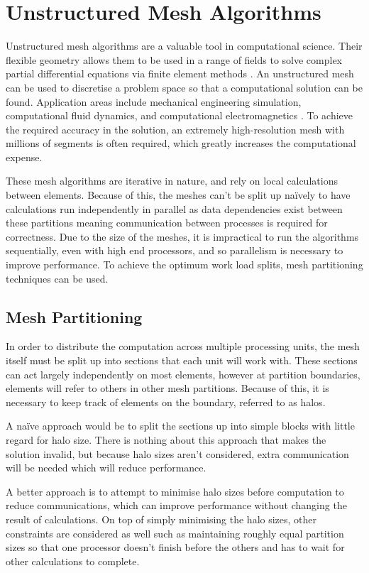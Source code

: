 \section{Unstructured Mesh Algorithms}
Unstructured mesh algorithms are a valuable tool in computational science. Their flexible geometry allows them to be used in a range of fields to solve complex partial differential equations via finite element methods \cite{FEM_PDESolutionsBook}. An unstructured mesh can be used to discretise a problem space so that a computational solution can be found. Application areas include mechanical engineering simulation, computational fluid dynamics, and computational electromagnetics \cite{OP2_Performance}. To achieve the required accuracy in the solution, an extremely high-resolution mesh with millions of segments is often required, which greatly increases the computational expense.

These mesh algorithms are iterative in nature, and rely on local calculations between elements. Because of this, the meshes can't be split up naïvely to have calculations run independently in parallel as data dependencies exist between these partitions meaning communication between processes is required for correctness. Due to the size of the meshes, it is impractical to run the algorithms sequentially, even with high end processors, and so parallelism is necessary to improve performance. To achieve the optimum work load splits, mesh partitioning techniques can be used.

\subsection{Mesh Partitioning}
In order to distribute the computation across multiple processing units, the mesh itself must be split up into sections that each unit will work with. These sections can act largely independently on most elements, however at partition boundaries, elements will refer to others in other mesh partitions. Because of this, it is necessary to keep track of elements on the boundary, referred to as halos.

A naïve approach would be to split the sections up into simple blocks with little regard for halo size. There is nothing about this approach that makes the solution invalid, but because halo sizes aren't considered, extra communication will be needed which will reduce performance.

A better approach is to attempt to minimise halo sizes before computation to reduce communications, which can improve performance without changing the result of calculations.  On top of simply minimising the halo sizes, other constraints are considered as well such as maintaining roughly equal partition sizes so that one processor doesn't finish before the others and has to wait for other calculations to complete.

